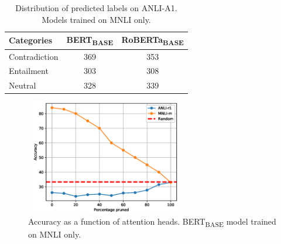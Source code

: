
\begin{table}
\small
\centering
\begin{tabular}{lcc}

\toprule
Categories			& BERT\textsubscript{BASE}   	& RoBERTa\textsubscript{BASE}   \\
\midrule
Contradiction		& 369   & 353 \\
Entailment   		& 303   & 308 \\
Neutral    			& 328   & 339 \\

\bottomrule
\end{tabular}
\caption{\label{table:predictedlabeldistribution} Distribution of predicted labels on ANLI-A1. Models trained on MNLI only.}
\end{table}


\begin{figure}
\centering
\includegraphics[width=7cm, height=5cm]{Figs4Paper/percentage_pruned_vs_accuracy.eps}
\caption{\label{fig:attentionheads} Accuracy as a function of attention heads. BERT\textsubscript{BASE} model trained on MNLI only.}
\end{figure}



